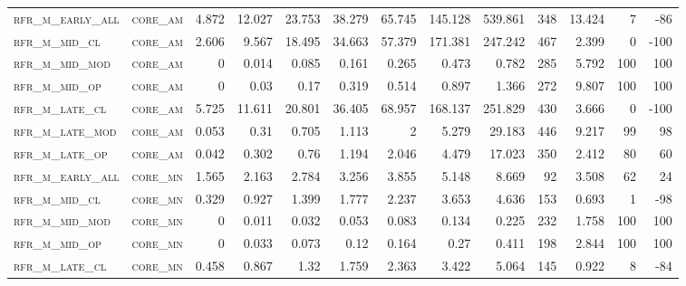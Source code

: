 \begin{landscape}
\begin{center}
\begin{footnotesize}
\begin{longtable}{llrrrrrrrr|rrr}
\textsc{rfr\_m\_early\_all} & \textsc{core\_am  }   & 4.872   & 12.027  & 23.753  & 38.279   & 65.745   & 145.128  & 539.861  & 348    & 13.424        & 7             & -86             \\
\textsc{rfr\_m\_mid\_cl   } & \textsc{core\_am  }   & 2.606   & 9.567   & 18.495  & 34.663   & 57.379   & 171.381  & 247.242  & 467    & 2.399         & 0             & -100            \\
\textsc{rfr\_m\_mid\_mod  } & \textsc{core\_am  }   & 0       & 0.014   & 0.085   & 0.161    & 0.265    & 0.473    & 0.782    & 285    & 5.792         & 100           & 100             \\
\textsc{rfr\_m\_mid\_op   } & \textsc{core\_am  }   & 0       & 0.03    & 0.17    & 0.319    & 0.514    & 0.897    & 1.366    & 272    & 9.807         & 100           & 100             \\
\textsc{rfr\_m\_late\_cl  } & \textsc{core\_am  }   & 5.725   & 11.611  & 20.801  & 36.405   & 68.957   & 168.137  & 251.829  & 430    & 3.666         & 0             & -100            \\
\textsc{rfr\_m\_late\_mod } & \textsc{core\_am  }   & 0.053   & 0.31    & 0.705   & 1.113    & 2        & 5.279    & 29.183   & 446    & 9.217         & 99            & 98              \\
\textsc{rfr\_m\_late\_op  } & \textsc{core\_am  }   & 0.042   & 0.302   & 0.76    & 1.194    & 2.046    & 4.479    & 17.023   & 350    & 2.412         & 80            & 60              \\
\textsc{rfr\_m\_early\_all} & \textsc{core\_mn  }   & 1.565   & 2.163   & 2.784   & 3.256    & 3.855    & 5.148    & 8.669    & 92     & 3.508         & 62            & 24              \\
\textsc{rfr\_m\_mid\_cl   } & \textsc{core\_mn  }   & 0.329   & 0.927   & 1.399   & 1.777    & 2.237    & 3.653    & 4.636    & 153    & 0.693         & 1             & -98             \\
\textsc{rfr\_m\_mid\_mod  } & \textsc{core\_mn  }   & 0       & 0.011   & 0.032   & 0.053    & 0.083    & 0.134    & 0.225    & 232    & 1.758         & 100           & 100             \\
\textsc{rfr\_m\_mid\_op   } & \textsc{core\_mn  }   & 0       & 0.033   & 0.073   & 0.12     & 0.164    & 0.27     & 0.411    & 198    & 2.844         & 100           & 100             \\
\textsc{rfr\_m\_late\_cl  } & \textsc{core\_mn  }   & 0.458   & 0.867   & 1.32    & 1.759    & 2.363    & 3.422    & 5.064    & 145    & 0.922         & 8             & -84             \\

\end{longtable}
\end{footnotesize}
\end{center}
\end{landscape}
